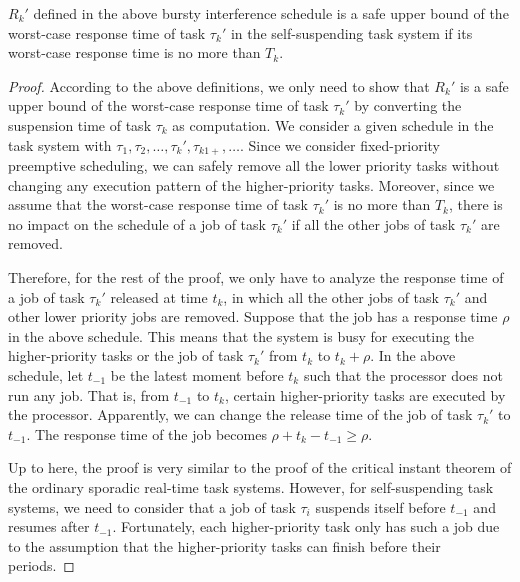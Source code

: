 \begin{lemma}
\label{lemma:critical}
 $R_k'$ defined in the above bursty interference schedule is a safe upper bound of the worst-case response time of task $\tau_k'$ in the self-suspending task system if its worst-case response time is no more than $T_k$.
\end{lemma}
\begin{proof}
According to the above definitions, we only need to show that $R_k'$ is a safe upper bound of the worst-case response time of task $\tau_k'$ by converting the suspension time of task $\tau_k$ as computation. We consider a given schedule in the task system with $\tau_1, \tau_2, \ldots, \tau_k', \tau_{k1+}, \ldots$. Since we consider fixed-priority preemptive scheduling, we can safely remove all the lower priority tasks without changing any execution pattern of the higher-priority tasks. Moreover, since we assume that the worst-case response time of task $\tau_k'$ is no more than $T_k$, there is no impact on the schedule of a job of task $\tau_k'$ if all the other jobs of task $\tau_k'$ are removed. 


Therefore, for the rest of the proof, we only have to analyze the response time of a job of task $\tau_k'$ released at time $t_k$, in which all the other jobs of task $\tau_k'$ and other lower priority jobs are removed. Suppose that the job has a response time $\rho$ in the above schedule. This means that the system is busy for executing the higher-priority tasks or the job of task $\tau_k'$ from $t_k$ to $t_k+\rho$. In the above schedule, let $t_{-1}$ be the latest moment before $t_k$ such that the processor does not run any job. That is, from $t_{-1}$ to $t_k$, certain higher-priority tasks are executed by the processor. Apparently, we can change the release time of the job of task $\tau_k'$ to $t_{-1}$. The response time of the job becomes $\rho+t_k-t_{-1} \geq \rho$. 

Up to here, the proof is very similar to the proof of the critical instant theorem of the ordinary sporadic real-time task systems. However, for self-suspending task systems, we need to consider that a job of task $\tau_i$ suspends itself before $t_{-1}$ and resumes after $t_{-1}$.  Fortunately, each higher-priority task only has such a job due to the assumption that the higher-priority tasks can finish before their periods. 


\end{proof}
  
  

  
  
  
  
  